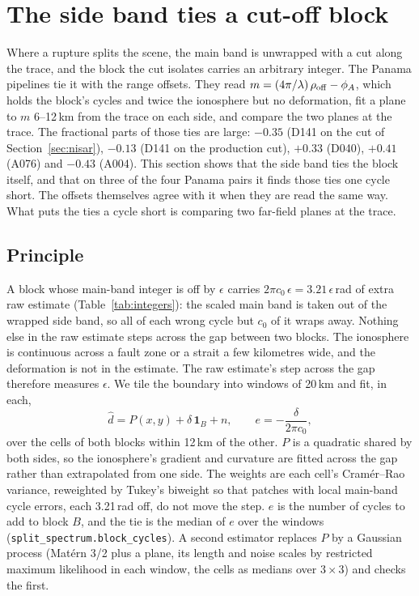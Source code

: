 \section{The side band ties a cut-off block}
\label{sec:sbtie}

Where a rupture splits the scene, the main band is unwrapped with a cut along the trace, and the block the cut
isolates carries an arbitrary integer. The Panama pipelines tie it with the range offsets. They read
$m = (4\pi/\lambda)\,\rho_\mathrm{off} - \phi_A$, which holds the block's cycles and twice the ionosphere but no
deformation, fit a plane to $m$ 6--12\,km from the trace on each side, and compare the two planes at the trace. The
fractional parts of those ties are large: $-0.35$ (D141 on the cut of Section~\ref{sec:nisar}), $-0.13$ (D141 on the
production cut), $+0.33$ (D040), $+0.41$ (A076) and $-0.43$ (A004). This section shows that the side band ties the
block itself, and that on three of the four Panama pairs it finds those ties one cycle short. The offsets themselves
agree with it when they are read the same way. What puts the ties a cycle short is comparing two far-field planes at the
trace.

\subsection{Principle}
A block whose main-band integer is off by $\epsilon$ carries $2\pi c_0\,\epsilon = 3.21\,\epsilon$\,rad of extra raw
estimate (Table~\ref{tab:integers}): the scaled main band is taken out of the wrapped side band, so all of each wrong
cycle but $c_0$ of it wraps away. Nothing else in the raw estimate steps across the gap between two blocks. The
ionosphere is continuous across a fault zone or a strait a few kilometres wide, and the deformation is not in the
estimate. The raw estimate's step across the gap therefore measures $\epsilon$. We tile the boundary into windows of
20\,km and fit, in each,
\begin{equation}
  \hat d = P(x, y) + \delta\,\mathbf{1}_B + n, \qquad e = -\frac{\delta}{2\pi c_0},
  \label{eq:tie}
\end{equation}
over the cells of both blocks within 12\,km of the other. $P$ is a quadratic shared by both sides, so the ionosphere's
gradient and curvature are fitted across the gap rather than extrapolated from one side. The weights are each cell's
Cram\'er--Rao variance, reweighted by Tukey's biweight so that patches with local main-band cycle errors, each
3.21\,rad off, do not move the step. $e$ is the number of cycles to add to block $B$, and the tie is the median of $e$
over the windows (\texttt{split\_spectrum.\allowbreak block\_cycles}). A second estimator replaces $P$ by a Gaussian
process (Mat\'ern 3/2 plus a plane, its length and noise scales by restricted maximum likelihood in each window, the
cells as medians over $3\times3$) and checks the first.

